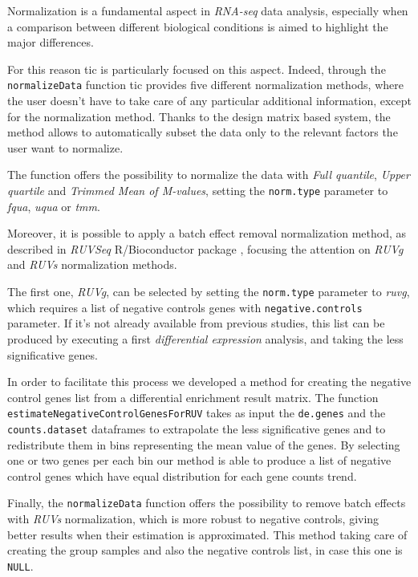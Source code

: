 Normalization is a fundamental aspect in \textit{RNA-seq} data analysis, especially when a comparison between different biological conditions is aimed to highlight the major differences.

For this reason \gls{tic} is particularly focused on this aspect. Indeed, through the \lstinline!normalizeData! function \gls{tic} provides five different normalization methods, where the user doesn't have to take care of any particular additional information, except for the normalization method.
Thanks to the design matrix based system, the method allows to automatically subset the data only to the relevant factors the user want to normalize.

The function offers the possibility to normalize the data with \textit{Full quantile}, \textit{Upper quartile} and \textit{Trimmed Mean of M-values}, setting the \lstinline!norm.type! parameter to \textit{fqua}, \textit{uqua} or \textit{tmm}.

Moreover, it is possible to apply a batch effect removal normalization method, as described in \textit{RUVSeq} R/Bioconductor package \cite{Risso2014h}, focusing the attention on \textit{RUVg} and \textit{RUVs} normalization methods.

The first one, \textit{RUVg}, can be selected by setting the \lstinline!norm.type! parameter to \textit{ruvg}, which requires a list of negative controls genes with \lstinline!negative.controls! parameter.
If it's not already available from previous studies, this list can be produced by executing a first \textit{differential expression} analysis, and taking the less significative genes.

In order to facilitate this process we developed a method for creating the negative control genes list from a differential enrichment result matrix.
The function \lstinline!estimateNegativeControlGenesForRUV! takes as input the \lstinline!de.genes! and the \lstinline!counts.dataset! dataframes to extrapolate the less significative genes and to redistribute them in bins representing the mean value of the genes.
By selecting one or two genes per each bin our method is able to produce a list of negative control genes which have equal distribution for each gene counts trend.

Finally, the \lstinline!normalizeData! function offers the possibility to remove batch effects with \textit{RUVs} normalization, which is more robust to negative controls, giving better results when their estimation is approximated.
This method taking care of creating the group samples and also the negative controls list, in case this one is \lstinline!NULL!.
